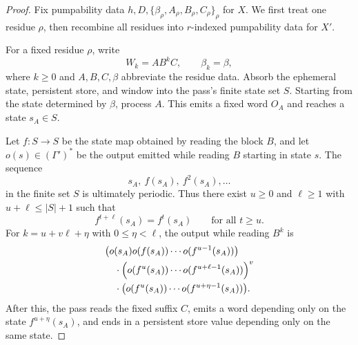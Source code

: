 \begin{proof}
Fix pumpability data
$h,D,\{\beta_\rho,A_\rho,B_\rho,C_\rho\}_\rho$ for $X$. We first treat one
residue $\rho$, then recombine all residues into $r$-indexed pumpability data
for $X'$.

For a fixed residue $\rho$, write
\[
  W_k=A B^k C,
  \qquad
  \beta_k=\beta,
\]
where $k\ge0$ and $A,B,C,\beta$ abbreviate the residue data. Absorb the
ephemeral state, persistent store, and window into the pass's finite state set
$S$. Starting from the state determined by $\beta$, process $A$. This emits a
fixed word $O_A$ and reaches a state $s_A\in S$.

Let $f:S\to S$ be the state map obtained by reading the block $B$, and let
$o(s)\in(\Gamma')^*$ be the output emitted while reading $B$ starting in state
$s$. The sequence
\[
  s_A,\ f(s_A),\ f^2(s_A),\ldots
\]
in the finite set $S$ is ultimately periodic. Thus there exist $u\ge0$ and
$\ell\ge1$ with $u+\ell\le |S|+1$ such that
\[
  f^{t+\ell}(s_A)=f^t(s_A)
  \qquad\text{for all }t\ge u.
\]
For $k=u+v\ell+\eta$ with $0\le\eta<\ell$, the output while reading $B^k$ is
\[
\begin{aligned}
  &\bigl(o(s_A)o(f(s_A))\cdots o(f^{u-1}(s_A))\bigr)\\
  &\quad\cdot\Bigl(o(f^u(s_A))\cdots
  o(f^{u+\ell-1}(s_A))\Bigr)^v\\
  &\quad\cdot\bigl(o(f^u(s_A))\cdots
  o(f^{u+\eta-1}(s_A))\bigr).
\end{aligned}
\]
After this, the pass reads the fixed suffix $C$, emits a word depending only
on the state $f^{u+\eta}(s_A)$, and ends in a persistent store value depending
only on the same state.


\end{proof}
